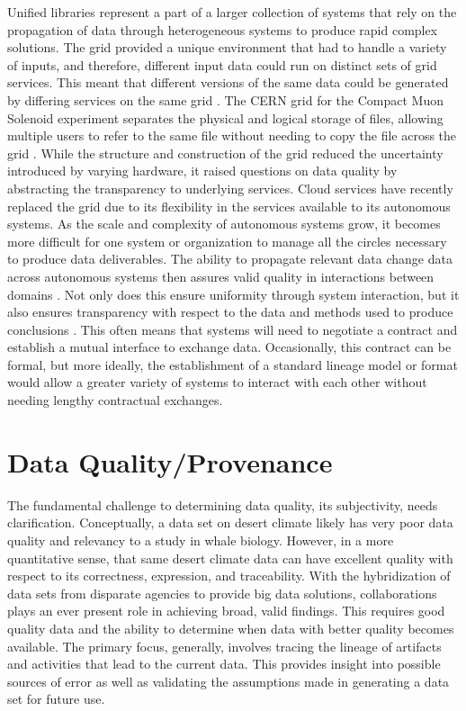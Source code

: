 Unified libraries represent a part of a larger collection of systems that rely on the propagation of data through heterogeneous systems to produce rapid complex solutions.
The grid provided a unique environment that had to handle a variety of inputs, and therefore, different input data could run on distinct sets of grid services.
This meant that different versions of the same data could be generated by differing services on the same grid \cite{Kovse2003VGridAVS}.
The CERN grid for the Compact Muon Solenoid experiment separates the physical and logical storage of files, allowing multiple users to refer to the same file without needing to copy the file across the grid \cite{Holtman:687353}.
While the structure and construction of the grid reduced the uncertainty introduced by varying hardware, it raised questions on data quality by abstracting the transparency to underlying services.
Cloud services have recently replaced the grid due to its flexibility in the services available to its autonomous systems.
As the scale and complexity of autonomous systems grow, it becomes more difficult for one system or organization to manage all the circles necessary to produce data deliverables.
The ability to propagate relevant data change data across autonomous systems then assures valid quality in interactions between domains \cite{Systems02champagne:data}.
Not only does this ensure uniformity through system interaction, but it also ensures transparency with respect to the data and methods used to produce conclusions \cite{Tagger2005}.
This often means that systems will need to negotiate a contract and establish a mutual interface to exchange data.
Occasionally, this contract can be formal, but more ideally, the establishment of a standard lineage model or format would allow a greater variety of systems to interact with each other without needing lengthy contractual exchanges.

\section{Data Quality/Provenance}

The fundamental challenge to determining data quality, its subjectivity, needs clarification.
Conceptually, a data set on desert climate likely has very poor data quality and relevancy to a study in whale biology.
However, in a more quantitative sense, that same desert climate data can have excellent quality with respect to its correctness, expression, and traceability.
With the hybridization of data sets from disparate agencies to provide big data solutions, collaborations plays an ever present role in achieving broad, valid findings.
This requires good quality data and the ability to determine when data with better quality becomes available.
The primary focus, generally, involves tracing the lineage of artifacts and activities that lead to the current data.
This provides insight into possible sources of error as well as validating the assumptions made in generating a data set for future use.

